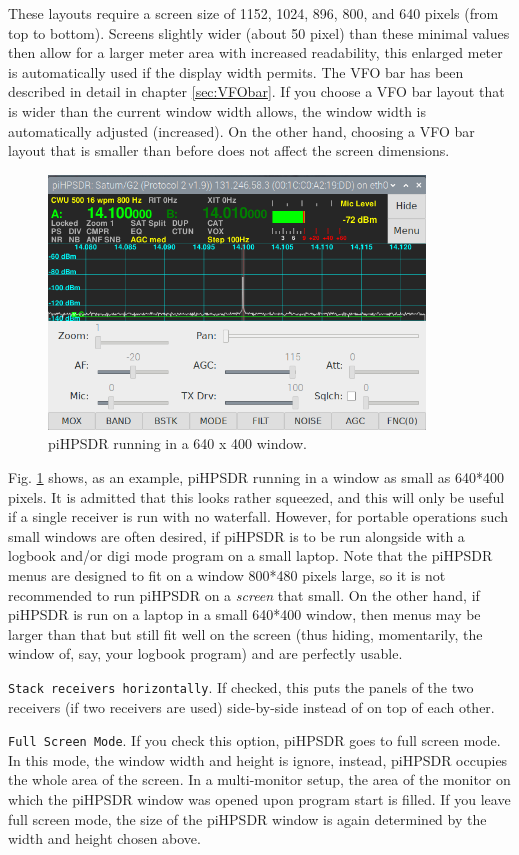 \documentclass[12pt]{book}
\def\rett#1{\texttt{\color{red}#1}}
\def\pH{pi\-HPSDR\xspace}
\begin{document}
These layouts require a screen size of 1152, 1024, 896, 800, and 640 pixels (from top to
bottom). Screens slightly wider (about 50 pixel) than these minimal values then allow for a larger meter
area with increased readability, this enlarged meter is automatically used if the display
width permits.
The VFO bar has been described in detail in chapter
\ref{sec:VFObar}. If you choose a VFO bar layout that is wider than the current
window width allows, the window width is automatically adjusted (increased). On the
other hand, choosing a VFO bar layout that is smaller than before does not affect
the screen dimensions.

\begin{figure}[ht!]
\center
\includegraphics[width=10cm]{640x400.png}
\caption{\pH running in a 640 x 400 window.}
\label{fig:640x400}
\end{figure}

Fig. \ref{fig:640x400} shows, as an example, \pH running in a window as small
as 640*400 pixels. It is admitted that this looks rather squeezed, and this
will only be useful if a single receiver is run with no waterfall. However, for
portable operations such small windows are often desired,
if \pH is to be run alongside with a logbook and/or digi mode program on a small laptop.
Note that the \pH menus are designed to fit on a window 800*480 pixels large, so
it is not recommended to run \pH on a \textit{screen} that small. On the other hand,
if \pH is run on a laptop in a small 640*400 window, then menus may be larger than
that but still fit well on the screen (thus hiding, momentarily, the window of,
say, your logbook program) and are perfectly usable.

\rett{Stack receivers horizontally}. If checked, this puts the panels
of the two receivers (if two receivers are used) side-by-side instead of on top
of each other.

\rett{Full Screen Mode}. If you check this option, \pH goes to full screen mode.
In this mode, the window width and height is ignore, instead, \pH occupies
the whole area of the screen. In a multi-monitor setup, the area of the monitor
on which the \pH window was opened upon program start is filled.
If you leave full screen mode, the size of the \pH window is again
determined by the width and height chosen above.
\end{document}

